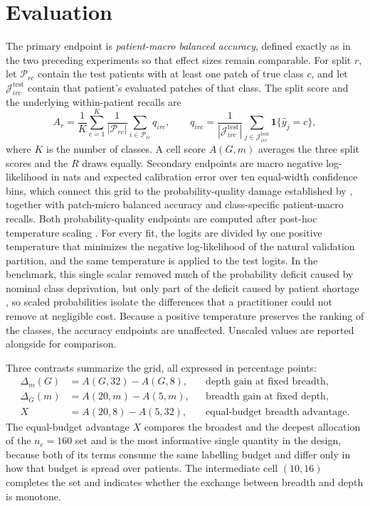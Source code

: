 \documentclass[11pt]{article}
\begin{document}
\section{Evaluation}
\label{sec:evaluation}
The primary endpoint is \emph{patient-macro balanced accuracy}, defined exactly as in the two preceding experiments so that effect sizes remain comparable. For split $r$, let $\mathcal P_{rc}$ contain the test patients with at least one patch of true class $c$, and let $\mathcal J^{\mathrm{test}}_{irc}$ contain that patient's evaluated patches of that class. The split score and the underlying within-patient recalls are
\begin{equation}
  A_r=\frac1K\sum_{c=1}^{K}\frac1{|\mathcal P_{rc}|}\sum_{i\in\mathcal P_{rc}}q_{irc},
  \qquad
  q_{irc}=\frac1{|\mathcal J^{\mathrm{test}}_{irc}|}\sum_{j\in\mathcal J^{\mathrm{test}}_{irc}}\mathbf 1\{\widehat y_j=c\},
  \label{eq:accuracy}
\end{equation}
\noindent where $K$ is the number of classes. A cell score $A(G,m)$ averages the three split scores and the $R$ draws equally. Secondary endpoints are macro negative log-likelihood in nats and expected calibration error over ten equal-width confidence bins, which connect this grid to the probability-quality damage established by \citet{queisler2026benchmarkResults}, together with patch-micro balanced accuracy and class-specific patient-macro recalls. Both probability-quality endpoints are computed after post-hoc temperature scaling \citep{guo2017calibration}. For every fit, the logits are divided by one positive temperature that minimizes the negative log-likelihood of the natural validation partition, and the same temperature is applied to the test logits. In the benchmark, this single scalar removed much of the probability deficit caused by nominal class deprivation, but only part of the deficit caused by patient shortage \citep{queisler2026benchmarkResults}, so scaled probabilities isolate the differences that a practitioner could not remove at negligible cost. Because a positive temperature preserves the ranking of the classes, the accuracy endpoints are unaffected. Unscaled values are reported alongside for comparison.

Three contrasts summarize the grid, all expressed in percentage points:
\begin{align}
  \Delta_m(G)&=A(G,32)-A(G,8), &&\text{depth gain at fixed breadth},\label{eq:depth}\\
  \Delta_G(m)&=A(20,m)-A(5,m), &&\text{breadth gain at fixed depth},\label{eq:breadth}\\
  X&=A(20,8)-A(5,32), &&\text{equal-budget breadth advantage}.\label{eq:isobudget}
\end{align}
\noindent The equal-budget advantage $X$ compares the broadest and the deepest allocation of the $n_c=160$ set and is the most informative single quantity in the design, because both of its terms consume the same labelling budget and differ only in how that budget is spread over patients. The intermediate cell $(10,16)$ completes the set and indicates whether the exchange between breadth and depth is monotone.
\end{document}
